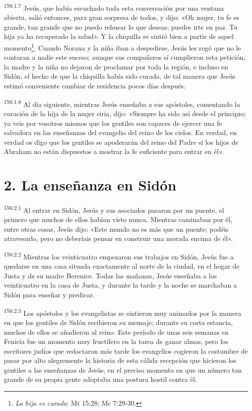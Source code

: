 \par
\textsuperscript{156:1.7} Jesús, que había escuchado toda esta conversación por una ventana abierta, salió entonces, para gran sorpresa de todos, y dijo: «Oh mujer, tu fe es grande, tan grande que no puedo rehusar lo que deseas; puedes irte en paz. Tu hija ya ha recuperado la salud». Y la chiquilla se sintió bien a partir de aquel momento\footnote{\textit{La hija es curada}: Mt 15:28; Mc 7:29-30.}. Cuando Norana y la niña iban a despedirse, Jesús les rogó que no le contaran a nadie este suceso; aunque sus compañeros sí cumplieron esta petición, la madre y la niña no dejaron de proclamar por toda la región, e incluso en Sidón, el hecho de que la chiquilla había sido curada, de tal manera que Jesús estimó conveniente cambiar de residencia pocos días después.

\par
\textsuperscript{156:1.8} Al día siguiente, mientras Jesús enseñaba a sus apóstoles, comentando la curación de la hija de la mujer siria, dijo: «Siempre ha sido así desde el principio; ya veis por vosotros mismos que los gentiles son capaces de ejercer una fe salvadora en las enseñanzas del evangelio del reino de los cielos. En verdad, en verdad os digo que los gentiles se apoderarán del reino del Padre si los hijos de Abraham no están dispuestos a mostrar la fe suficiente para entrar en él».

\section*{2. La enseñanza en Sidón}
\par
\textsuperscript{156:2.1} Al entrar en Sidón, Jesús y sus asociados pasaron por un puente, el primero que muchos de ellos habían visto nunca. Mientras caminaban por él, entre otras cosas, Jesús dijo: «Este mundo no es más que un puente; podéis atravesarlo, pero no deberíais pensar en construir una morada encima de él».

\par
\textsuperscript{156:2.2} Mientras los veinticuatro empezaron sus trabajos en Sidón, Jesús fue a quedarse en una casa situada exactamente al norte de la ciudad, en el hogar de Justa y de su madre Berenice. Todas las mañanas, Jesús enseñaba a los veinticuatro en la casa de Justa, y durante la tarde y la noche se marchaban a Sidón para enseñar y predicar.

\par
\textsuperscript{156:2.3} Los apóstoles y los evangelistas se sintieron muy animados por la manera en que los gentiles de Sidón recibieron su mensaje; durante su corta estancia, muchos de ellos se añadieron al reino. Este período de unas seis semanas en Fenicia fue un momento muy fructífero en la tarea de ganar almas, pero los escritores judíos que redactaron más tarde los evangelios cogieron la costumbre de pasar por alto alegremente la historia de esta cálida recepción que hicieron los gentiles a las enseñanzas de Jesús, en el preciso momento en que un número tan grande de su propia gente adoptaba una postura hostil contra él.

